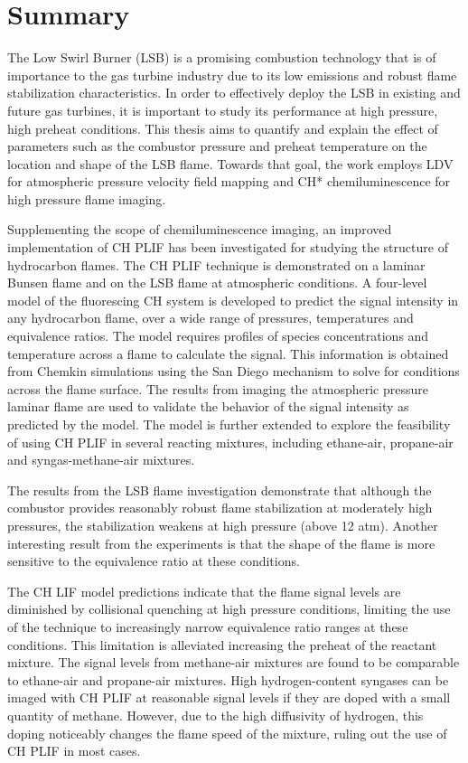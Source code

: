 \chapter*{Summary}

The Low Swirl Burner (LSB) is a promising combustion technology that is of importance to the gas turbine industry due to its low  emissions and robust flame stabilization characteristics.
In order to effectively deploy the LSB in existing and future gas turbines, it is important to study its performance at high pressure, high preheat conditions.
This thesis aims to quantify and explain the effect of parameters such as the combustor pressure and preheat temperature on the location and shape of the LSB flame.
Towards that goal, the work employs LDV for atmospheric pressure velocity field mapping and CH* chemiluminescence for high pressure flame imaging.

Supplementing the scope of chemiluminescence imaging, an improved implementation of CH PLIF has been investigated for studying the structure of hydrocarbon flames.
The CH PLIF technique is demonstrated on a laminar Bunsen flame and on the LSB flame at atmospheric conditions.
A four-level model of the fluorescing CH system is developed to predict the signal intensity in any hydrocarbon flame, over a wide range of pressures, temperatures and equivalence ratios.
The model requires profiles of species concentrations and temperature across a flame to calculate the signal.
This information is obtained from Chemkin simulations using the San Diego mechanism to solve for conditions across the flame surface.
The results from imaging the atmospheric pressure laminar flame are used to validate the behavior of the signal intensity as predicted by the model.
The model is further extended to explore the feasibility of using CH PLIF in several reacting mixtures, including ethane-air, propane-air and syngas-methane-air mixtures.

The results from the LSB flame investigation demonstrate that although the combustor provides reasonably robust flame stabilization at moderately high pressures, the stabilization weakens at high pressure (above 12 atm).
Another interesting result from the experiments is that the shape of the flame is more sensitive to the equivalence ratio at these conditions.

The CH LIF model predictions indicate that the flame signal levels are diminished by collisional quenching at high pressure conditions, limiting the use of the technique to increasingly narrow equivalence ratio ranges at these conditions.
This limitation is alleviated increasing the preheat of the reactant mixture.
The signal levels from methane-air mixtures are found to be comparable to ethane-air and propane-air mixtures.
High hydrogen-content syngases can be imaged with CH PLIF at reasonable signal levels if they are doped with a small quantity of methane.
However, due to the high diffusivity of hydrogen, this doping noticeably changes the flame speed of the mixture, ruling out the use of CH PLIF in most cases.

